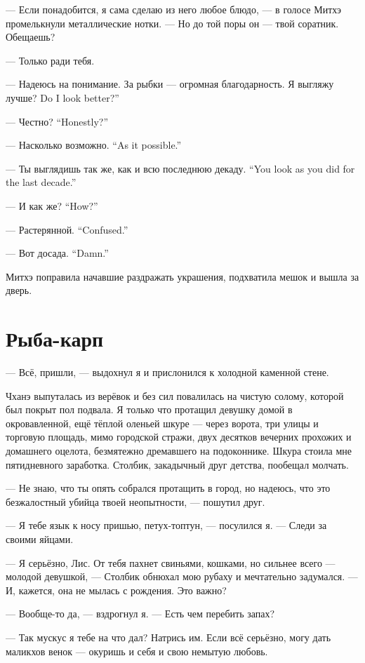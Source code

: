 --- Если понадобится, я сама сделаю из него любое блюдо, --- в голосе Митхэ промелькнули металлические нотки.
--- Но до той поры он --- твой соратник.
Обещаешь?

--- Только ради тебя.

--- Надеюсь на понимание.
За рыбки --- огромная благодарность.
{Я выгляжу лучше?}
{Do I look better?''}

{--- Честно?}
{``Honestly?''}

{--- Насколько возможно.}
{``As it possible.''}

{--- Ты выглядишь так же, как и всю последнюю декаду.}
{``You look as you did for the last decade.''}

{--- И как же?}
{``How?''}

{--- Растерянной.}
{``Confused.''}

{--- Вот досада.}
{``Damn.''}

Митхэ поправила начавшие раздражать украшения, подхватила мешок и вышла за дверь.

\section{Рыба-карп}

--- Всё, пришли, --- выдохнул я и прислонился к холодной каменной стене.

Чханэ выпуталась из верёвок и без сил повалилась на чистую солому, которой был покрыт пол подвала.
Я только что протащил девушку домой в окровавленной, ещё тёплой оленьей шкуре --- через ворота, три улицы и торговую площадь, мимо городской стражи, двух десятков вечерних прохожих и домашнего оцелота, безмятежно дремавшего на подоконнике.
Шкура стоила мне пятидневного заработка.
Столбик, закадычный друг детства, пообещал молчать.

--- Не знаю, что ты опять собрался протащить в город, но надеюсь, что это безжалостный убийца твоей неопытности, --- пошутил друг.

--- Я тебе язык к носу пришью, петух-топтун, --- посулился я.
--- Следи за своими яйцами.

--- Я серьёзно, Лис.
От тебя пахнет свиньями, кошками, но сильнее всего --- молодой девушкой, --- Столбик обнюхал мою рубаху и мечтательно задумался.
--- И, кажется, она не мылась с рождения.
Это важно?

--- Вообще-то да, --- вздрогнул я.
--- Есть чем перебить запах?

--- Так мускус я тебе на что дал?
Натрись им.
Если всё серьёзно, могу дать маликхов венок --- окуришь и себя и свою немытую любовь.

